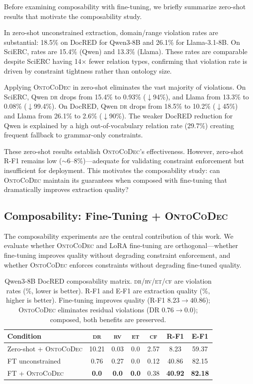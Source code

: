 \documentclass[11pt,a4paper]{article}
\newcommand{\sys}{\textsc{OntoCoDec}}
\newcommand{\DR}{\textsc{dr}}
\newcommand{\RV}{\textsc{rv}}
\newcommand{\ET}{\textsc{et}}
\newcommand{\CF}{\textsc{cf}}
\begin{document}
Before examining composability with fine-tuning, we briefly summarize zero-shot results that motivate the composability study.

In zero-shot unconstrained extraction, domain/range violation rates are substantial: 18.5\% on DocRED for Qwen3-8B and 26.1\% for Llama-3.1-8B. On SciERC, rates are 15.4\% (Qwen) and 13.3\% (Llama). These rates are comparable despite SciERC having 14$\times$ fewer relation types, confirming that violation rate is driven by constraint tightness rather than ontology size.

Applying \sys{} in zero-shot eliminates the vast majority of violations. On SciERC, Qwen \DR{} drops from 15.4\% to 0.93\% ($\downarrow$94\%), and Llama from 13.3\% to 0.08\% ($\downarrow$99.4\%). On DocRED, Qwen \DR{} drops from 18.5\% to 10.2\% ($\downarrow$45\%) and Llama from 26.1\% to 2.6\% ($\downarrow$90\%). The weaker DocRED reduction for Qwen is explained by a high out-of-vocabulary relation rate (29.7\%) creating frequent fallback to grammar-only constraints.

These zero-shot results establish \sys{}'s effectiveness. However, zero-shot R-F1 remains low ($\sim$6--8\%)---adequate for validating constraint enforcement but insufficient for deployment. This motivates the composability study: can \sys{} maintain its guarantees when composed with fine-tuning that dramatically improves extraction quality?

\subsection{Composability: Fine-Tuning + \sys{}}
\label{sec:composability}

The composability experiments are the central contribution of this work. We evaluate whether \sys{} and LoRA fine-tuning are orthogonal---whether fine-tuning improves quality without degrading constraint enforcement, and whether \sys{} enforces constraints without degrading fine-tuned quality.

\begin{table}[t]
\centering
\small
\caption{Qwen3-8B DocRED composability matrix. \DR{}/\RV{}/\ET{}/\CF{} are violation rates (\%, lower is better). R-F1 and E-F1 are extraction quality (\%, higher is better). Fine-tuning improves quality (R-F1 $8.23 \to 40.86$); \sys{} eliminates residual violations (DR $0.76 \to 0.0$); composed, both benefits are preserved.}
\label{tab:qwen-composability}
\begin{tabular}{@{}lcccccc@{}}
\toprule
\textbf{Condition} & \textbf{\DR{}} & \textbf{\RV{}} & \textbf{\ET{}} & \textbf{\CF{}} & \textbf{R-F1} & \textbf{E-F1} \\
\midrule
Zero-shot + \sys{} & 10.21 & 0.03 & 0.0 & 2.57 & 8.23 & 59.37 \\
FT unconstrained & 0.76 & 0.27 & 0.0 & 0.12 & 40.86 & 82.15 \\
FT + \sys{} & \textbf{0.0} & \textbf{0.0} & \textbf{0.0} & 0.38 & \textbf{40.92} & \textbf{82.18} \\
\bottomrule
\end{tabular}
\end{table}
\end{document}

